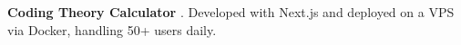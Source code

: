 \textbf{Coding Theory Calculator} \href{https://github.com/pl3lee/coding-theory-calculator}{\faGithub}. Developed with Next.js and deployed on a VPS via Docker, handling 50+ users daily.